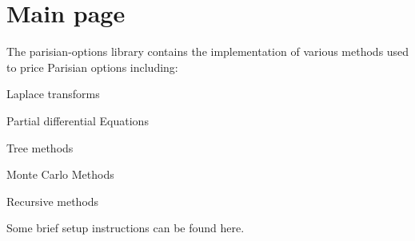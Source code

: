 \chapter{Main page}
\hypertarget{index}{}\label{index}
\label{index_md__c_1_2_users_2_s_u_m_u_n_2_one_drive_01-_01_london_01_school_01of_01_economics_2_research_2_code_2_c_p_p___l_s_e_2parisian-options_2_r_e_a_d_m_e}%
%
 The {\ttfamily parisian-\/options} library contains the implementation of various methods used to price Parisian options including\+:
\begin{DoxyItemize}
\item Laplace transforms
\item Partial differential Equations
\item Tree methods
\item Monte Carlo Methods
\item Recursive methods
\end{DoxyItemize}

Some brief setup instructions can be found here. 